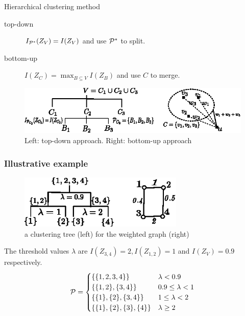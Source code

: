 \documentclass[notheorems]{beamer}
\begin{document}
\begin{frame}{Hierarchical clustering method}

\begin{description}
\item[top-down] $I_{\P^*}(Z_V)=I(Z_V)$ and use $\P^*$ to split.
\item[bottom-up] $I(Z_C) = \max_{B\subseteq V} I(Z_B)$ and use $C$ to merge.
\end{description}
\begin{figure}
\centering
\includegraphics[width=\textwidth]{paper/pic/two_approach.eps}
\caption{Left: top-down approach. Right: bottom-up approach}
\end{figure}
\end{frame}
\begin{frame}
\frametitle{Illustrative example}
\begin{figure}
\centering
\includegraphics[width=0.7\textwidth]{paper/pic/threshold.eps}
\caption{a clustering tree (left) for the weighted graph (right)}
\end{figure}

The threshold values $\lambda$ are $I(Z_{3,4})=2, I(Z_{1,2})=1$ and $I(Z_V)=0.9$ respectively.
\begin{equation*}
\P = 
\begin{cases}
\{\{1,2,3,4\}\} & \lambda < 0.9 \\
\{\{1,2\},\{3,4\}\} & 0.9 \leq \lambda < 1 \\
\{\{1\},\{2\},\{3,4\}\} & 1 \leq \lambda < 2\\
\{\{1\},\{2\},\{3\},\{4\}\} & \lambda \geq 2
\end{cases}
\end{equation*}
\end{frame}
\end{document}
